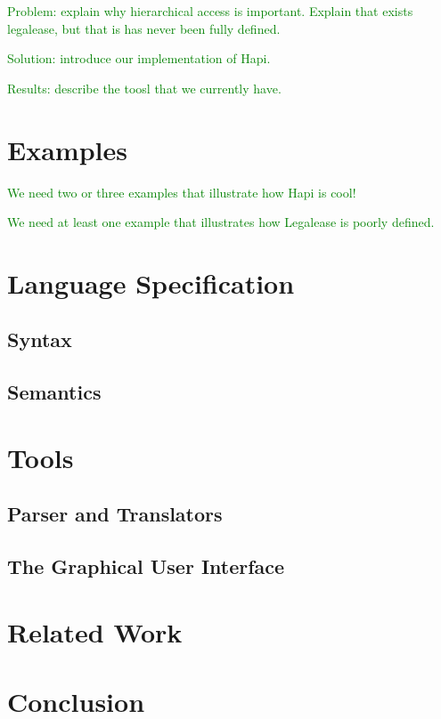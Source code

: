 \documentclass[sigplan,screen,anonymous,review]{acmart}\settopmatter{printfolios=true,printccs=false,printacmref=false}
\newcommand{\fer}[1]{\textcolor{green}{#1}}
\begin{document}
\fer{Problem: explain why hierarchical access is important. Explain that exists legalease, but that is has never been fully defined.}

\fer{Solution: introduce our implementation of Hapi.}

\fer{Results: describe the toosl that we currently have.}

\section{Examples}
\label{sec:examples}

\fer{We need two or three examples that illustrate how Hapi is cool!}

\fer{We need at least one example that illustrates how Legalease is poorly defined.}

\section{Language Specification}
\label{sec:spec}

\subsection{Syntax}
\label{sub:syntax}

\subsection{Semantics}
\label{sub:semantics}

\section{Tools}
\label{sec:tools}

\subsection{Parser and Translators}
\label{sub:parser}

\subsection{The Graphical User Interface}
\label{sub:gui}

\section{Related Work}
\label{sec:rw}

\section{Conclusion}
\label{sec:conc}


\end{document}
